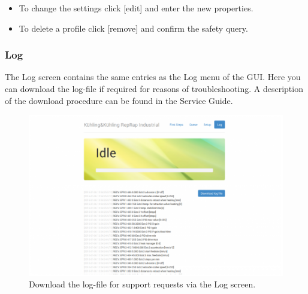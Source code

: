 \begin{itemize}
  \item To change the settings click [edit] and enter the new properties.
  \item To delete a profile click [remove] and confirm the safety query.
\end{itemize}

\subsubsection{Log}

The Log screen contains the same entries as the Log menu of the GUI. Here you can download the log-file if required for reasons of troubleshooting. A description of the download procedure can be found in the Service Guide. 

\begin{figure}[H]
  \centering
  \includegraphics[width=.7\linewidth]{./img/wi_log_1.png}
  \caption{Download the log-file for support requests via the Log screen.}
\end{figure}